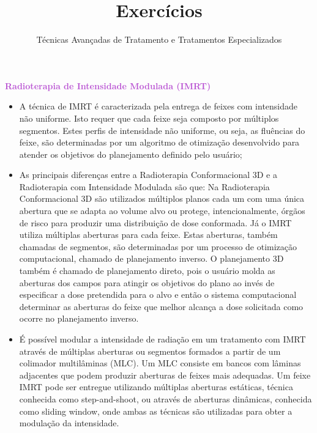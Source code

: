 \documentclass[11pt,a4paper]{article}
\title{\LobsterTwo\Huge{Exercícios}}
\author{\LobsterTwo\Large{Técnicas Avançadas de Tratamento e Tratamentos Especializados} \nocite{*}}
\date{\LobsterTwo{Dalila Mendonça}}
\newcounter{exemplo}
\begin{document}
	\maketitle


\begin{exemplo}
    \textcolor{MediumOrchid}{\LobsterTwo\textbf{Radioterapia de Intensidade Modulada (IMRT)}}
    \begin{itemize}
        \item A técnica de IMRT é caracterizada pela entrega de feixes com intensidade não uniforme. Isto requer que cada feixe seja composto por múltiplos segmentos. Estes perfis de intensidade não uniforme, ou seja, as fluências do feixe,  são determinadas por um algoritmo de otimização desenvolvido para atender os objetivos do planejamento definido pelo usuário;
        
        \item As principais diferenças entre a Radioterapia Conformacional 3D e a Radioterapia com Intensidade Modulada são que: Na Radioterapia Conformacional 3D são utilizados múltiplos planos cada um com uma única abertura que se adapta ao volume alvo ou protege, intencionalmente, órgãos de risco para produzir uma distribuição de dose conformada. Já o IMRT utiliza múltiplas aberturas para cada feixe. Estas aberturas, também chamadas de segmentos, são determinadas por um processo de otimização computacional, chamado de \textcolor{CarnationPink}{planejamento inverso}. O planejamento 3D também é chamado de \textcolor{CarnationPink}{planejamento direto}, pois o usuário molda as aberturas dos campos para atingir os objetivos do plano ao invés de especificar a dose pretendida para o alvo e então o sistema computacional determinar as aberturas do feixe que melhor alcança a dose solicitada como ocorre no planejamento inverso.
        
        \item É possível modular a intensidade de radiação em um tratamento com IMRT através de múltiplas aberturas ou segmentos formados a partir de um colimador multilâminas (MLC). Um MLC consiste em bancos com lâminas adjacentes que podem produzir aberturas de feixes mais adequadas. Um feixe IMRT pode ser entregue utilizando múltiplas aberturas estáticas, técnica conhecida como step-and-shoot, ou através de aberturas dinâmicas, conhecida como sliding window, onde ambas as técnicas são utilizadas para obter a modulação da intensidade. 
        

\end{itemize}
\end{exemplo}
\end{document}
